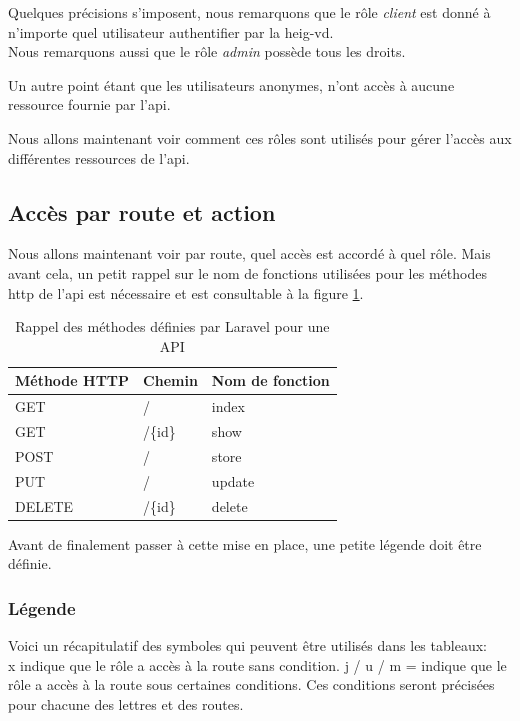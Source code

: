 \documentclass[
    iai, %
    il, %
]{heig-tb}
\begin{document}
Quelques précisions s'imposent, nous remarquons que le rôle \emph{client} est donné à n'importe quel utilisateur authentifier par la \Gls{heig-vd}. \\
Nous remarquons aussi que le rôle \emph{admin} possède tous les droits.

Un autre point étant que les utilisateurs anonymes, n'ont accès à aucune ressource fournie par l'\Gls{api}.

Nous allons maintenant voir comment ces rôles sont utilisés pour gérer l'accès aux différentes ressources de l'\Gls{api}.

\subsection{Accès par route et action}
Nous allons maintenant voir par route, quel accès est accordé à quel rôle.
Mais avant cela, un petit rappel sur le nom de fonctions utilisées pour les méthodes \Gls{http} de l'\Gls{api} est nécessaire et est consultable à la figure \ref{rappel-methode-api}.

\begin{table}[h]
    \begin{center}
        \caption{Rappel des méthodes définies par Laravel pour une API \label{rappel-methode-api}}
        \begin{tabularx}{1.0\textwidth} {X|X|X}
            Méthode HTTP & Chemin  & Nom de fonction \\ \hline
            GET          & /       & index           \\
            GET          & /\{id\} & show            \\
            POST         & /       & store           \\
            PUT          & /       & update          \\
            DELETE       & /\{id\} & delete          \\
        \end{tabularx}
    \end{center}
\end{table}

Avant de finalement passer à cette mise en place, une petite légende doit être définie.

\subsubsection{Légende}
Voici un récapitulatif des symboles qui peuvent être utilisés dans les tableaux: \\
x indique que le rôle a accès à la route sans condition.
j / u / m = indique que le rôle a accès à la route sous certaines conditions. Ces conditions seront précisées pour chacune des lettres et des routes.
\end{document}
